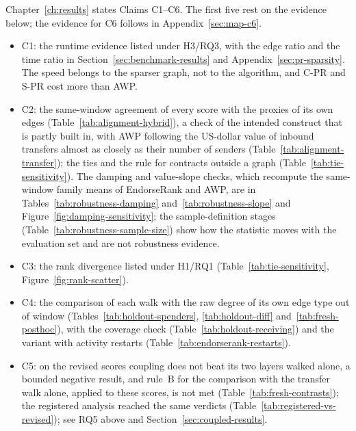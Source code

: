 
Chapter~\ref{ch:results} states Claims C1--C6. The first five rest on the evidence below; the evidence for C6 follows in Appendix~\ref{sec:map-c6}.

\begin{itemize}
\item C1: the runtime evidence listed under H3/RQ3, with the edge ratio and the time ratio in Section~\ref{sec:benchmark-results} and Appendix~\ref{sec:pr-sparsity}. The speed belongs to the sparser graph, not to the algorithm, and C-PR and S-PR cost more than AWP.
\item C2: the same-window agreement of every score with the proxies of its own edges (Table~\ref{tab:alignment-hybrid}), a check of the intended construct that is partly built in, with AWP following the US-dollar value of inbound transfers almost as closely as their number of senders (Table~\ref{tab:alignment-transfer}); the ties and the rule for contracts outside a graph (Table~\ref{tab:tie-sensitivity}). The damping and value-slope checks, which recompute the same-window family means of EndorseRank and AWP, are in Tables~\ref{tab:robustness-damping} and~\ref{tab:robustness-slope} and Figure~\ref{fig:damping-sensitivity}; the sample-definition stages (Table~\ref{tab:robustness-sample-size}) show how the statistic moves with the evaluation set and are not robustness evidence.
\item C3: the rank divergence listed under H1/RQ1 (Table~\ref{tab:tie-sensitivity}, Figure~\ref{fig:rank-scatter}).
\item C4: the comparison of each walk with the raw degree of its own edge type out of window (Tables~\ref{tab:holdout-spenders}, \ref{tab:holdout-diff} and~\ref{tab:fresh-posthoc}), with the coverage check (Table~\ref{tab:holdout-receiving}) and the variant with activity restarts (Table~\ref{tab:endorserank-restarts}).
\item C5: on the revised scores coupling does not beat its two layers walked alone, a bounded negative result, and rule~B for the comparison with the transfer walk alone, applied to these scores, is not met (Table~\ref{tab:fresh-contrasts}); the registered analysis reached the same verdicts (Table~\ref{tab:registered-vs-revised}); see RQ5 above and Section~\ref{sec:coupled-results}.
\end{itemize}



